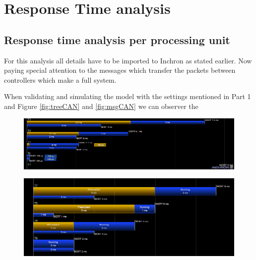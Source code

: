 \section{Response Time analysis}

\subsection{Response time analysis per processing unit}

For this analysis all details have to be imported to Inchron as stated earlier. Now paying special attention to the messages which transfer the packets between controllers which make a full system. 

When validating and simulating the model with the settings mentioned in Part 1 and Figure \ref{fig:treeCAN} and \ref{fig:msgCAN} we can observer the 



\begin{figure}[h!]
	\begin{center}
		\includegraphics[width=\linewidth]{img/pu1-response-time}
		\caption{}
		\label{fig:pu1rt}
	\end{center}
\end{figure}

\begin{figure}[h!]
	\begin{center}
		\includegraphics[width=\linewidth]{img/pu2-response-time}
		\caption{}
		\label{fig:pu2rt}
	\end{center}
\end{figure}



